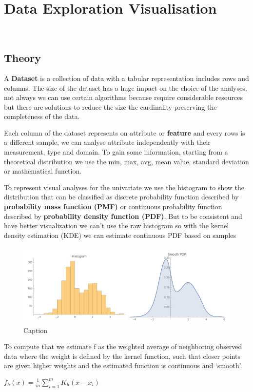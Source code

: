 \chapter{Data Exploration Visualisation}\
\section{Theory}
A \textbf{Dataset} is a collection of data with a tabular representation includes rows and columns. The size of the dataset has a huge impact on the choice of the analyses, not always we can use certain algorithms because require considerable resources but there are solutions to reduce the size the cardinality preserving the completeness of the data.

Each column of the dataset represents on attribute or \textbf{feature} and every rows is a different sample, we can analyse attribute independently with their measurement, type and domain. To gain some information, starting from a theoretical distribution we use the min, max, avg, mean value, standard deviation or mathematical function.

To represent visual analyses for the univariate we use the histogram to show the distribution that can be classified as discrete probability function described by \textbf{probability mass function (PMF)} or continuous probability function described by \textbf{probability density function (PDF)}. But to be consistent and have better visualization we can't use the raw histogram so with the kernel density estimation (KDE) we can estimate continuous PDF based on samples
\begin{figure}[H]
    \centering
    \includegraphics[scale=0.75]{images/DataExplVis/KernelDF.png}
    \caption{Caption}
    \label{fig:enter-label}
\end{figure}
To compute that we estimate f as the weighted average of neighboring observed data where the weight is defined by the kernel function, such that closer points are given higher weights and the estimated function is continuous and ‘smooth’.
\begin{center}
    $ f_{h}(x) = \frac{1}{m} \sum\limits_{i=1}^m K_{h} (x-x_{i})$
\end{center}


